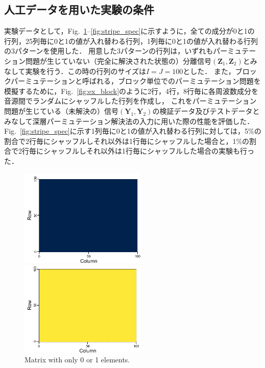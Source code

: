 \subsection{人工データを用いた実験の条件}
\label{sec:ex_condition_matrix}
実験データとして，Fig.~\ref{fig:01mat_spec}--\ref{fig:stripe_spec}に示すように，全ての成分が0と1の行列，25列毎に0と1の値が入れ替わる行列，1列毎に0と1の値が入れ替わる行列の3パターンを使用した．
用意した3パターンの行列は，いずれもパーミュテーション問題が生じていない（完全に解決された状態の）分離信号$(\bm{Z}_1, \bm{Z}_2)$とみなして実験を行う．この時の行列のサイズは$I=J=100$とした．
また，ブロックパーミュテーションと呼ばれる，ブロック単位でのパーミュテーション問題を模擬するために，Fig.~\ref{fig:ex_block}のように2行，4行，8行毎に各周波数成分を音源間でランダムにシャッフルした行列を作成し，
これをパーミュテーション問題が生じている（未解決の）信号$(\bm{Y}_1, \bm{Y}_2)$の検証データ及びテストデータとみなして深層パーミュテーション解決法の入力に用いた際の性能を評価した．
Fig.~\ref{fig:stripe_spec}に示す1列毎に0と1の値が入れ替わる行列に対しては，5\%の割合で2行毎にシャッフルしそれ以外は1行毎にシャッフルした場合と，1\%の割合で2行毎にシャッフルしそれ以外は1行毎にシャッフルした場合の実験も行った．

\begin{figure}[htbp]
    \begin{minipage}[b]{0.45\linewidth}
      \centering
      \includegraphics[keepaspectratio, width=6.0cm]{figures/origi_spec/0mat.pdf}
    \end{minipage}
    \begin{minipage}[b]{0.45\linewidth}
      \centering
      \includegraphics[keepaspectratio, width=6.0cm]{figures/origi_spec/1mat.pdf}
    \end{minipage}
    \caption{Matrix with only 0 or 1 elements.}
    \label{fig:01mat_spec}
\end{figure}

